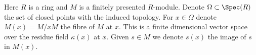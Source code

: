 \begin{situation}
\label{situation-splitting}
Here $R$ is a ring and $M$ is a finitely presented $R$-module.
Denote $\Omega \subset \Spec(R)$ the set of closed points
with the induced topology. For $x \in \Omega$ denote
$M(x) = M/xM$ the fibre of $M$ at $x$. This is a finite
dimensional vector space over the residue field $\kappa(x)$ at $x$.
Given $s \in M$ we denote $s(x)$ the image of $s$ in $M(x)$.
\end{situation}